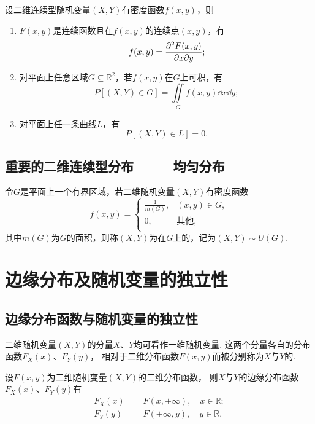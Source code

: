\begin{theorem}
设二维连续型随机变量\((X,Y)\)有密度函数\(f(x,y)\)，则
\begin{enumerate}
\item \(F(x,y)\)是连续函数且在\(f(x,y)\)的连续点\((x,y)\)，有\[
f(x,y) = \pdv{F(x,y)}{x}{y};
\]
\item 对平面上任意区域\(G \subseteq \mathbb{R}^2\)，若\(f(x,y)\)在\(G\)上可积，有\[
P\left[(X,Y) \in G\right] = \iint\limits_G{f(x,y) \dd{x}\dd{y}};
\]
\item 对平面上任一条曲线\(L\)，有\[
P\left[(X,Y) \in L\right] = 0.
\]
\end{enumerate}
\end{theorem}

\subsection{重要的二维连续型分布 —— 均匀分布}
\begin{definition}
令\(G\)是平面上一个有界区域，若二维随机变量\((X,Y)\)有密度函数\[
f(x,y) = \left\{ \begin{array}{ll}
\frac{1}{m(G)}, & (x,y) \in G, \\
0, & \text{其他}, \\
\end{array} \right.
\]其中\(m(G)\)为\(G\)的面积，则称\((X,Y)\)为在\(G\)上的，记为\((X,Y) \sim U(G)\).
\end{definition}

\section{边缘分布及随机变量的独立性}
\subsection{边缘分布函数与随机变量的独立性}
\begin{definition}
二维随机变量\((X,Y)\)的分量\(X\)、\(Y\)均可看作一维随机变量.
这两个分量各自的分布函数\(F_X(x)\)、\(F_Y(y)\)，
相对于二维分布函数\(F(x,y)\)而被分别称为\(X\)与\(Y\)的.
\end{definition}

\begin{theorem}
设\(F(x,y)\)为二维随机变量\((X,Y)\)的二维分布函数，
则\(X\)与\(Y\)的边缘分布函数\(F_X(x)\)、\(F_Y(y)\)有
\begin{align*}
F_X(x) &= F(x,+\infty), \quad x \in \mathbb{R}; \\
F_Y(y) &= F(+\infty,y), \quad y \in \mathbb{R}.
\end{align*}
\end{theorem}

